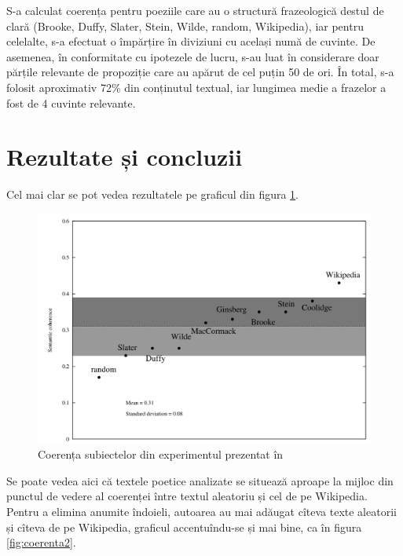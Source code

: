S-a calculat coerența pentru poeziile care au o structură frazeologică destul
de clară (Brooke, Duffy, Slater, Stein, Wilde, random, Wikipedia), iar pentru
celelalte, s-a efectuat o împărțire în diviziuni cu același numă de cuvinte.
De asemenea, în conformitate cu ipotezele de lucru, s-au luat în considerare doar
părțile relevante de propoziție care au apărut de cel puțin 50 de ori. În total,
s-a folosit aproximativ 72\% din conținutul textual, iar lungimea medie a
frazelor a fost de 4 cuvinte relevante.


\section{Rezultate și concluzii}

Cel mai clar se pot vedea rezultatele pe graficul din figura
\ref{fig:coerenta1}.

\begin{figure}[!htb]
  \centering
  \includegraphics[scale=0.3]{img/coherence1.png}
  \caption{Coerența subiectelor din experimentul prezentat în \cite{herbelot}}
  \label{fig:coerenta1}
\end{figure}


Se poate vedea aici că textele poetice analizate se situează aproape la mijloc
din punctul de vedere al coerenței între textul aleatoriu și cel de pe
Wikipedia. Pentru a elimina anumite îndoieli, autoarea au mai adăugat cîteva
texte aleatorii și cîteva de pe Wikipedia, graficul accentuîndu-se și mai bine,
ca în figura \ref{fig:coerenta2}.


